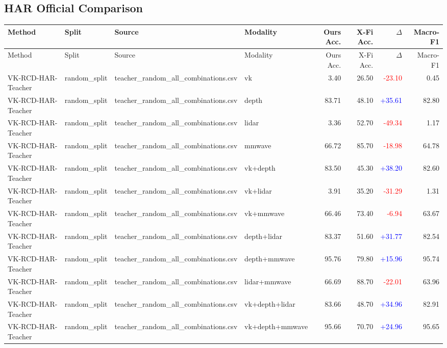 \documentclass[10pt]{article}
\begin{document}
\subsection*{HAR Official Comparison}
\begin{longtable}{llllrrrr}
\toprule
Method & Split & Source & Modality & Ours Acc. & X-Fi Acc. & $\Delta$ & Macro-F1\\
\midrule
\endfirsthead
\toprule
Method & Split & Source & Modality & Ours Acc. & X-Fi Acc. & $\Delta$ & Macro-F1\\
\midrule
\endhead
VK-RCD-HAR-Teacher & random\_split & teacher\_random\_all\_combinations.csv & vk & 3.40 & 26.50 & \textcolor{red}{-23.10} & 0.45\\
VK-RCD-HAR-Teacher & random\_split & teacher\_random\_all\_combinations.csv & depth & 83.71 & 48.10 & \textcolor{blue}{+35.61} & 82.80\\
VK-RCD-HAR-Teacher & random\_split & teacher\_random\_all\_combinations.csv & lidar & 3.36 & 52.70 & \textcolor{red}{-49.34} & 1.17\\
VK-RCD-HAR-Teacher & random\_split & teacher\_random\_all\_combinations.csv & mmwave & 66.72 & 85.70 & \textcolor{red}{-18.98} & 64.78\\
VK-RCD-HAR-Teacher & random\_split & teacher\_random\_all\_combinations.csv & vk+depth & 83.50 & 45.30 & \textcolor{blue}{+38.20} & 82.60\\
VK-RCD-HAR-Teacher & random\_split & teacher\_random\_all\_combinations.csv & vk+lidar & 3.91 & 35.20 & \textcolor{red}{-31.29} & 1.31\\
VK-RCD-HAR-Teacher & random\_split & teacher\_random\_all\_combinations.csv & vk+mmwave & 66.46 & 73.40 & \textcolor{red}{-6.94} & 63.67\\
VK-RCD-HAR-Teacher & random\_split & teacher\_random\_all\_combinations.csv & depth+lidar & 83.37 & 51.60 & \textcolor{blue}{+31.77} & 82.54\\
VK-RCD-HAR-Teacher & random\_split & teacher\_random\_all\_combinations.csv & depth+mmwave & 95.76 & 79.80 & \textcolor{blue}{+15.96} & 95.74\\
VK-RCD-HAR-Teacher & random\_split & teacher\_random\_all\_combinations.csv & lidar+mmwave & 66.69 & 88.70 & \textcolor{red}{-22.01} & 63.96\\
VK-RCD-HAR-Teacher & random\_split & teacher\_random\_all\_combinations.csv & vk+depth+lidar & 83.66 & 48.70 & \textcolor{blue}{+34.96} & 82.91\\
VK-RCD-HAR-Teacher & random\_split & teacher\_random\_all\_combinations.csv & vk+depth+mmwave & 95.66 & 70.70 & \textcolor{blue}{+24.96} & 95.65\\

\end{longtable}
\end{document}
